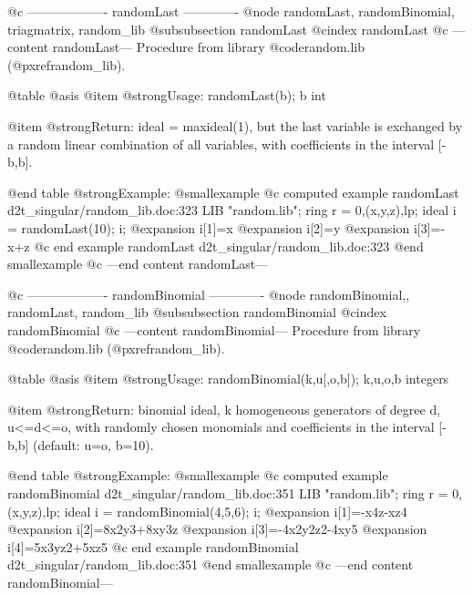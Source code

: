 @c ------------------- randomLast -------------
@node randomLast, randomBinomial, triagmatrix, random_lib
@subsubsection randomLast
@cindex randomLast
@c ---content randomLast---
Procedure from library @code{random.lib} (@pxref{random_lib}).

@table @asis
@item @strong{Usage:}
randomLast(b); b int

@item @strong{Return:}
ideal = maxideal(1), but the last variable is exchanged by a random
linear combination of all variables, with coefficients in the
interval [-b,b].

@end table
@strong{Example:}
@smallexample
@c computed example randomLast d2t_singular/random_lib.doc:323 
LIB "random.lib";
ring  r = 0,(x,y,z),lp;
ideal i = randomLast(10);
i;
@expansion{} i[1]=x
@expansion{} i[2]=y
@expansion{} i[3]=-x+z
@c end example randomLast d2t_singular/random_lib.doc:323
@end smallexample
@c ---end content randomLast---

@c ------------------- randomBinomial -------------
@node randomBinomial,, randomLast, random_lib
@subsubsection randomBinomial
@cindex randomBinomial
@c ---content randomBinomial---
Procedure from library @code{random.lib} (@pxref{random_lib}).

@table @asis
@item @strong{Usage:}
randomBinomial(k,u[,o,b]); k,u,o,b integers

@item @strong{Return:}
binomial ideal, k homogeneous generators of degree d, u<=d<=o, with
randomly chosen monomials and coefficients in the interval [-b,b]
(default: u=o, b=10).

@end table
@strong{Example:}
@smallexample
@c computed example randomBinomial d2t_singular/random_lib.doc:351 
LIB "random.lib";
ring  r = 0,(x,y,z),lp;
ideal i = randomBinomial(4,5,6);
i;
@expansion{} i[1]=-x4z-xz4
@expansion{} i[2]=8x2y3+8xy3z
@expansion{} i[3]=-4x2y2z2-4xy5
@expansion{} i[4]=5x3yz2+5xz5
@c end example randomBinomial d2t_singular/random_lib.doc:351
@end smallexample
@c ---end content randomBinomial---
